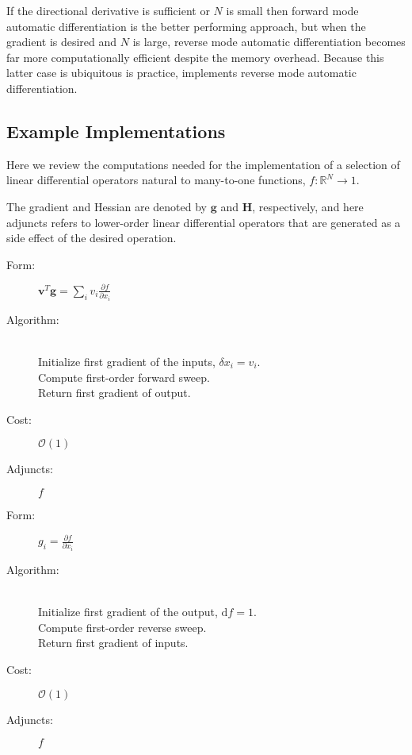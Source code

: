If the directional derivative is sufficient or $N$ is small then forward mode automatic
differentiation is the better performing approach, but when the gradient is desired and 
$N$ is large, reverse mode automatic differentiation becomes far more computationally 
efficient despite the memory overhead.  Because this latter case is ubiquitous is
practice, \nomad implements reverse mode automatic differentiation.

\subsection{Example Implementations}

Here we review the computations needed for the implementation of a selection of
linear differential operators natural to many-to-one functions, 
$f : \mathbb{R}^{N} \rightarrow 1$.

The gradient and Hessian are denoted by $\mathbf{g}$ and $\mathbf{H}$, respectively,
and here adjuncts refers to lower-order linear differential operators that are generated
as a side effect of the desired operation.

\begin{tcolorbox}[colback=white,colframe=gray90, coltitle=black,boxrule=3pt,
fonttitle=\bfseries,title=Directional Derivative]

	\begin{description}
		\item[Form:] $\displaystyle \mathbf{v}^{T} \mathbf{g} = \sum_{i} v_{i} \frac{ \partial f }{ \partial x_{i} } $
		\item[Algorithm:] \hfill \\
		Initialize first gradient of the inputs, $\delta x_{i} = v_{i}$. \\
		Compute first-order forward sweep. \\
		Return first gradient of output.
		\item[Cost:] $\mathcal{O} \! \left( 1 \right)$
		\item[Adjuncts:] $ f $
	\end{description}
	
\end{tcolorbox}

\begin{tcolorbox}[colback=white,colframe=gray90, coltitle=black,boxrule=3pt,
fonttitle=\bfseries,title=Gradient]
	
	\begin{description}
		\item[Form:] $\displaystyle g_{i} = \frac{ \partial f }{ \partial x_{i} } $
		\item[Algorithm:] \hfill \\
		Initialize first gradient of the output, $\mathrm{d} f = 1$. \\
		Compute first-order reverse sweep. \\
		Return first gradient of inputs.
		\item[Cost:] $\mathcal{O} \! \left( 1 \right)$
		\item[Adjuncts:] $ f $
	\end{description}
	
\end{tcolorbox}

